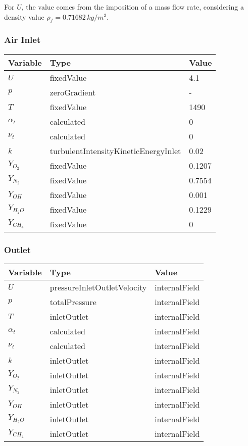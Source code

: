 For $U$, the value comes from the imposition of a mass flow rate, considering a density value $\rho_{f} = 0.71682 \, kg/m^3$.

\subsubsection*{Air Inlet}
\begin{table}[H]
    \centering
    \begin{tabular}{lll}
        \hline
        Variable & Type & Value \\ \hline
        $U$ & fixedValue & 4.1 \\
        $p$ & zeroGradient & - \\
        $T$ & fixedValue & 1490 \\
        $\alpha_t$ & calculated & 0 \\
        $\nu_t$ & calculated & 0 \\
        $k$ & turbulentIntensityKineticEnergyInlet & 0.02 \\
        $Y_{O_2}$ & fixedValue & 0.1207 \\
        $Y_{N_2}$ & fixedValue & 0.7554 \\
        $Y_{OH}$ & fixedValue & 0.001 \\
        $Y_{H_2O}$ & fixedValue & 0.1229 \\
        $Y_{CH_4}$ & fixedValue & 0 \\ \hline
    \end{tabular}
\end{table}

\subsubsection*{Outlet}
\begin{table}[H]
    \centering
    \begin{tabular}{lll}
        \hline
        Variable & Type & Value \\ \hline
        $U$ & pressureInletOutletVelocity & internalField \\
        $p$ & totalPressure & internalField \\
        $T$ & inletOutlet & internalField \\
        $\alpha_t$ & calculated & internalField \\
        $\nu_t$ & calculated & internalField \\
        $k$ & inletOutlet & internalField \\
        $Y_{O_2}$ & inletOutlet & internalField \\
        $Y_{N_2}$ & inletOutlet & internalField \\
        $Y_{OH}$ & inletOutlet & internalField \\
        $Y_{H_2O}$ & inletOutlet & internalField \\
        $Y_{CH_4}$ & inletOutlet & internalField \\ \hline
    \end{tabular}
\end{table}

